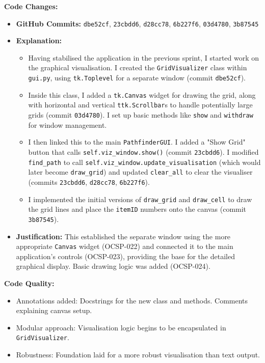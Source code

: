 \textbf{Code Changes:}
\begin{itemize}
	\item \textbf{GitHub Commits:} \verb|dbe52cf|, \verb|23cbdd6|, \verb|d28cc78|, \verb|6b227f6|, \verb|03d4780|, \verb|3b87545|
	\item \textbf{Explanation:}
	\begin{itemize}
		\item Having stabilised the application in the previous sprint, I started work on the graphical visualisation. I created the \verb|GridVisualizer| class within \verb|gui.py|, using \verb|tk.Toplevel| for a separate window (commit \verb|dbe52cf|).
		\item Inside this class, I added a \verb|tk.Canvas| widget for drawing the grid, along with horizontal and vertical \verb|ttk.Scrollbar|s to handle potentially large grids (commit \verb|03d4780|). I set up basic methods like \verb|show| and \verb|withdraw| for window management.
		\item I then linked this to the main \verb|PathfinderGUI|. I added a "Show Grid" button that calls \verb|self.viz_window.show()| (commit \verb|23cbdd6|). I modified \verb|find_path| to call \verb|self.viz_window.update_visualisation| (which would later become \verb|draw_grid|) and updated \verb|clear_all| to clear the visualiser (commits \verb|23cbdd6|, \verb|d28cc78|, \verb|6b227f6|).
		\item I implemented the initial versions of \verb|draw_grid| and \verb|draw_cell| to draw the grid lines and place the \verb|itemID| numbers onto the canvas (commit \verb|3b87545|).
	\end{itemize}
	\item \textbf{Justification:} This established the separate window using the more appropriate \verb|Canvas| widget (OCSP-022) and connected it to the main application's controls (OCSP-023), providing the base for the detailed graphical display. Basic drawing logic was added (OCSP-024).
\end{itemize}

\textbf{Code Quality:}
\begin{itemize}
	\item Annotations added: Docstrings for the new class and methods. Comments explaining canvas setup.
	\item Modular approach: Visualisation logic begins to be encapsulated in \verb|GridVisualizer|.
	\item Robustness: Foundation laid for a more robust visualisation than text output.
\end{itemize}

